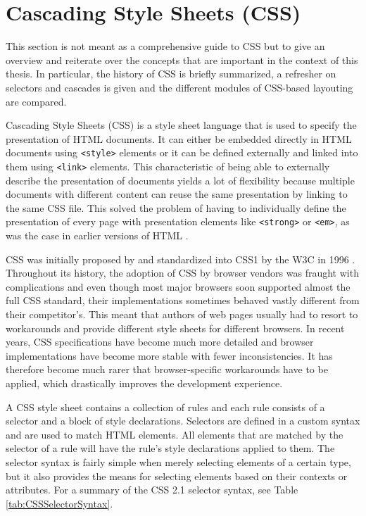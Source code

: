 \section{Cascading Style Sheets (CSS)}
\label{sec:CSS}

This section is not meant as a comprehensive guide to CSS but to give an overview and reiterate over the concepts that are important in the context of this thesis. In particular, the history of CSS is briefly summarized, a refresher on selectors and cascades is given and the different modules of CSS-based layouting are compared.

Cascading Style Sheets (CSS) is a style sheet language that is used to specify the presentation of HTML documents. It can either be embedded directly in HTML documents using \lstinline{<style>} elements or it can be defined externally and linked into them using \lstinline{<link>} elements. This characteristic of being able to externally describe the presentation of documents yields a lot of flexibility because multiple documents with different content can reuse the same presentation by linking to the same CSS file. This solved the problem of having to individually define the presentation of every page with presentation elements like \lstinline{<strong>} or \lstinline{<em>}, as was the case in earlier versions of HTML \parencite{HTML32}.

CSS was initially proposed by \cite{CSSProposal} and standardized into
CSS1 by the W3C in 1996 \parencite{CSS1}. Throughout its history, the
adoption of CSS by browser vendors was fraught with complications and
even though most major browsers soon supported almost the full CSS
standard, their implementations sometimes behaved vastly different
from their competitor's. This meant that authors of web pages usually
had to resort to workarounds and provide different style sheets for
different browsers. In recent years, CSS specifications have become
much more detailed \parencite{CSS21} and browser implementations have
become more stable with fewer inconsistencies. It has therefore become
much rarer that browser-specific workarounds have to be applied, which
drastically improves the development experience.

A CSS style sheet contains a collection of rules and each rule
consists of a selector and a block of style declarations. Selectors
are defined in a custom syntax and are used to match HTML
elements. All elements that are matched by the selector of a rule will
have the rule's style declarations applied to them. The selector
syntax is fairly simple when merely selecting elements of a certain
type, but it also provides the means for selecting elements based on
their contexts or attributes. For a summary of the CSS 2.1 selector
syntax, see Table \ref{tab:CSSSelectorSyntax}.








